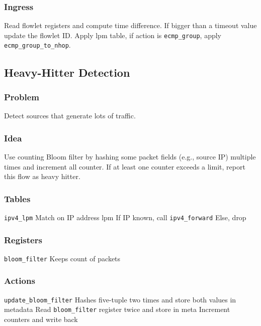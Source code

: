 \documentclass[a4paper, fontsize=8pt, landscape, DIV=1]{scrartcl}
\begin{document}
\begin{multicols*}{4}
  \subsubsection{Ingress} Read flowlet registers and compute time difference. If bigger than 
  a timeout value update the flowlet ID. Apply lpm table, if action is \texttt{ecmp\_group}, apply
  \texttt{ecmp\_group\_to\_nhop}.

  \subsection{Heavy-Hitter Detection}
  \subsubsection{Problem} Detect sources that generate lots of traffic.

  \subsubsection{Idea} Use counting Bloom filter by hashing some packet fields (e.g., source IP)
  multiple times and increment all counter. If at least one counter exceeds a limit, report
  this flow as heavy hitter.

  \subsubsection{Tables} 
  \begin{outline}
  \1 \texttt{ipv4\_lpm} Match on IP address lpm
    \2 If IP known, call \texttt{ipv4\_forward}
    \2 Else, drop
  \end{outline}
  

  \subsubsection{Registers}
  \begin{outline}
  \1 \texttt{bloom\_filter}
    \2 Keeps count of packets
  \end{outline}

  \subsubsection{Actions}
  \begin{outline}
  \1 \texttt{update\_bloom\_filter}
    \2 Hashes five-tuple two times and store both values in metadata
    \2 Read \texttt{bloom\_filter} register twice and store in meta
    \2 Increment counters and write back    
  \end{outline}


\end{multicols*}
\end{document}
